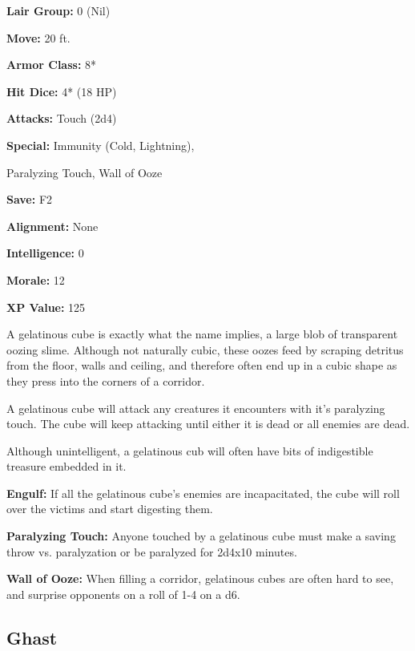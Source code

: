 \begin{multicols*}{2}
{\textbf{Lair Group:} 0 (Nil)

\textbf{Move:} 20 ft.

\textbf{Armor Class:} 8*

\textbf{Hit Dice:} 4* (18 HP)

\textbf{Attacks:} Touch (2d4)

\textbf{Special:} Immunity (Cold, Lightning), 

Paralyzing Touch, Wall of Ooze

\textbf{Save:} F2

\textbf{Alignment:} None

\textbf{Intelligence:} 0

\textbf{Morale:} 12

\textbf{XP Value:} 125}

A gelatinous cube is exactly what the name implies, a large blob of transparent oozing slime. Although not naturally cubic, these oozes feed by scraping detritus from the floor, walls and ceiling, and therefore often end up in a cubic shape as they press into the corners of a corridor.

A gelatinous cube will attack any creatures it encounters with it's paralyzing touch. The cube will keep attacking until either it is dead or all enemies are dead.

Although unintelligent, a gelatinous cub will often have bits of indigestible treasure embedded in it.

\textbf{Engulf:} If all the gelatinous cube's enemies are incapacitated, the cube will roll over the victims and start digesting them.

\textbf{Paralyzing Touch:} Anyone touched by a gelatinous cube must make a saving throw vs. paralyzation or be paralyzed for 2d4x10 minutes.

\textbf{Wall of Ooze:} When filling a corridor, gelatinous cubes are often hard to see, and surprise opponents on a roll of 1-4 on a d6.

\subsection{Ghast}
\end{multicols*}
